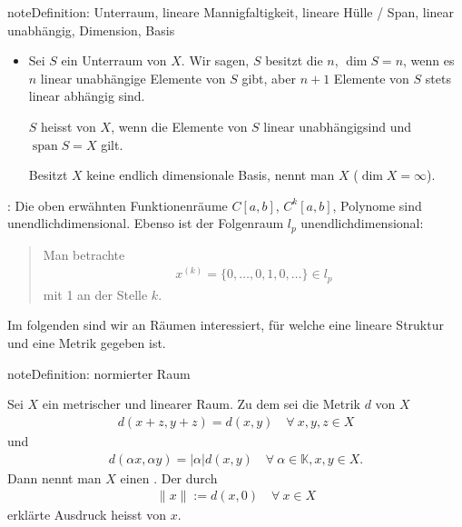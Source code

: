 \documentclass[letterpaper,10pt,english]{jupyterBook}
\begin{document}
\begin{sphinxadmonition}{note}{Definition: Unterraum, lineare Mannigfaltigkeit, lineare Hülle / Span, linear unabhängig, Dimension, Basis}
\begin{itemize}
\item {} 
Sei \(S\) ein Unterraum von \(X\). Wir sagen, \(S\) besitzt die  \(n\), \(\mathop{dim} S = n\), wenn es \(n\) linear unabhängige Elemente von \(S\) gibt, aber \(n+1\) Elemente von \(S\) stets linear abhängig sind.

\(S\) heisst  von \(X\), wenn die Elemente von \(S\) linear unabhängigsind und \(\mathop{span} S = X\) gilt.

Besitzt \(X\) keine endlich dimensionale Basis, nennt man \(X\)  (\(\mathop{dim} X = \infty\)).

\end{itemize}
\end{sphinxadmonition}

: Die oben erwähnten Funktionenräume \(C[a,b]\), \(C^k[a,b]\), Polynome sind unendlich\sphinxhyphen{}dimensional. Ebenso ist der Folgenraum \(l_p\) unendlich\sphinxhyphen{}dimensional:
\begin{quote}

Man betrachte
\begin{equation*}
\begin{split}x^{(k)} = \{0, \ldots, 0, 1, 0, \ldots \}\in l_p\end{split}
\end{equation*}
mit 1 an der Stelle \(k\).
\end{quote}

Im folgenden sind wir an Räumen interessiert, für welche eine lineare Struktur und eine Metrik gegeben ist.

\begin{sphinxadmonition}{note}{Definition: normierter Raum}

Sei \(X\) ein metrischer und linearer Raum. Zu dem sei die Metrik \(d\) von \(X\) 
\begin{equation*}
\begin{split}d(x+z, y+z) = d(x,y)\quad\forall\ x,y,z\in X\end{split}
\end{equation*}
und 
\begin{equation*}
\begin{split}d(\alpha x, \alpha y) = |\alpha| d(x,y)\quad \forall\ \alpha\in\mathbb{K}, x,y\in X.\end{split}
\end{equation*}
Dann nennt man \(X\) einen . Der durch
\begin{equation*}
\begin{split}\|x\| := d(x,0)\quad \forall\ x\in X\end{split}
\end{equation*}
erklärte Ausdruck heisst  von \(x\).
\end{sphinxadmonition}
\end{document}
